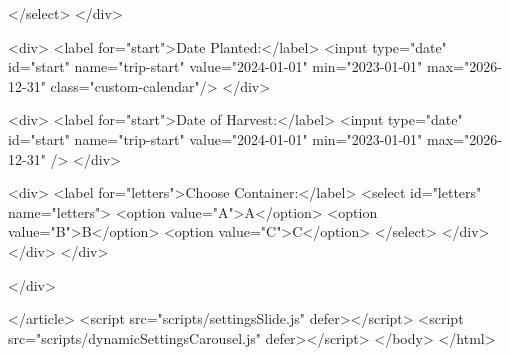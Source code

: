 \documentclass[12pt]{article} %
\begin{document}
\begin{htmlcode}[caption={Settings Page HTML}]
                    </select>
                </div>

                <div>
                    <label for="start">Date Planted:</label>
                    <input type="date" id="start" name="trip-start" value="2024-01-01" min="2023-01-01" max="2026-12-31" class="custom-calendar"/>
                </div>
                
                <div>
                    <label for="start">Date of Harvest:</label>
                    <input type="date" id="start" name="trip-start" value="2024-01-01" min="2023-01-01" max="2026-12-31" />
                </div>
            
                <div>
                    <label for="letters">Choose Container:</label>
                    <select id="letters" name="letters">
                            <option value="A">A</option>
                            <option value="B">B</option>
                            <option value="C">C</option>
                    </select>
                </div>
            </div>
        </div>

    </div>

</article>
<script src="scripts/settingsSlide.js"  defer></script>
<script src="scripts/dynamicSettingsCarousel.js"  defer></script>
</body>
</html>

\end{htmlcode}

\pagebreak
\end{document}
